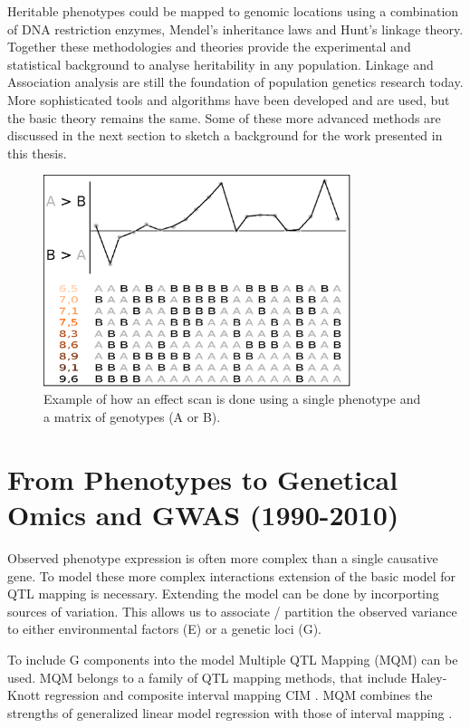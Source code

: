Heritable phenotypes could be mapped to genomic locations using a combination of DNA 
restriction enzymes, Mendel's inheritance laws and Hunt's linkage theory. Together these 
methodologies and theories provide the experimental and statistical background to 
analyse heritability in any population. Linkage and Association analysis are still the 
foundation of population genetics research today. More sophisticated tools and algorithms have been 
developed and are used, but the basic theory remains the same. Some of these more 
advanced methods are discussed in the next section to sketch a background for the work 
presented in this thesis.

\begin{figure}[h!]
 \centering
    \includegraphics[width=0.8\textwidth]{eps/image_1_1}
  \caption[Effect scan across the genome.]
    {Example of how an effect scan is done using a single phenotype and a matrix of genotypes (A or B).}
    \label{fig:effectscan}
\end{figure}

\section{From Phenotypes to Genetical Omics and GWAS (1990-2010)}

Observed phenotype expression is often more complex than a single causative gene. 
To model these more complex interactions extension of the basic model for QTL mapping is 
necessary. Extending the model can be done by incorporting sources of variation. This allows 
us to associate / partition the observed variance to either environmental factors (E) or a 
genetic loci (G).

To include G components into the model Multiple QTL Mapping (MQM) can be used. MQM belongs 
to a family of QTL mapping methods, that include Haley-Knott regression \cite{Haley:1992} 
and composite interval mapping CIM \cite{Zeng:1994}. MQM combines the strengths of 
generalized linear model regression with those of interval mapping \cite{Jansen:1993, Jansen:1994b}. 

